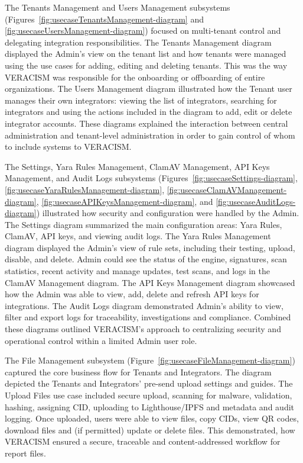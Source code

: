 The Tenants Management and Users Management subsystems
(Figures~\ref{fig:usecaseTenantsManagement-diagram} and
\ref{fig:usecaseUsersManagement-diagram}) focused on multi-tenant control and
delegating integration responsibilities. The Tenants Management diagram displayed the Admin's view on the tenant list and how tenants were managed using the use cases for adding, editing and deleting tenants. This was the way VERACISM was responsible for the onboarding or offboarding of entire organizations. The Users Management diagram illustrated how the Tenant user manages their own integrators: viewing the list of integrators, searching for integrators and using the actions included in the diagram to add, edit or delete integrator accounts. These diagrams explained the interaction between central administration and tenant-level administration in order to gain control of whom to include systems to VERACISM.

The Settings, Yara Rules Management, ClamAV Management, API Keys Management,
and Audit Logs subsystems
(Figures~\ref{fig:usecaseSettings-diagram},
\ref{fig:usecaseYaraRulesManagement-diagram},
\ref{fig:usecaseClamAVManagement-diagram},
\ref{fig:usecaseAPIKeysManagement-diagram}, and
\ref{fig:usecaseAuditLogs-diagram}) illustrated how security and configuration
were handled by the Admin. The Settings diagram summarized the main
configuration areas: Yara Rules, ClamAV, API keys, and viewing audit logs. The Yara Rules Management diagram displayed the Admin's view of rule sets, including their testing, upload, disable, and delete. Admin could see the status of the engine, signatures, scan statistics, recent activity and manage updates, test scans, and logs in the ClamAV Management diagram. The API Keys Management diagram showcased how the Admin was able to view, add, delete and refresh API keys for integrations. The Audit Logs diagram demonstrated Admin's ability to view, filter and export logs for traceability, investigations and compliance. Combined these diagrams outlined VERACISM's approach to centralizing security and operational control within a limited Admin user role.

The File Management subsystem (Figure~\ref{fig:usecaseFileManagement-diagram})
captured the core business flow for Tenants and Integrators. The diagram depicted the Tenants and Integrators' pre-send upload settings and guides. The Upload Files use case included secure upload, scanning for malware, validation, hashing, assigning CID, uploading to Lighthouse/IPFS and metadata and audit logging. Once uploaded, users were able to view files, copy CIDs, view QR codes, download files and (if permitted) update or delete files. This demonstrated, how VERACISM ensured a secure, traceable and content-addressed workflow for report files.

